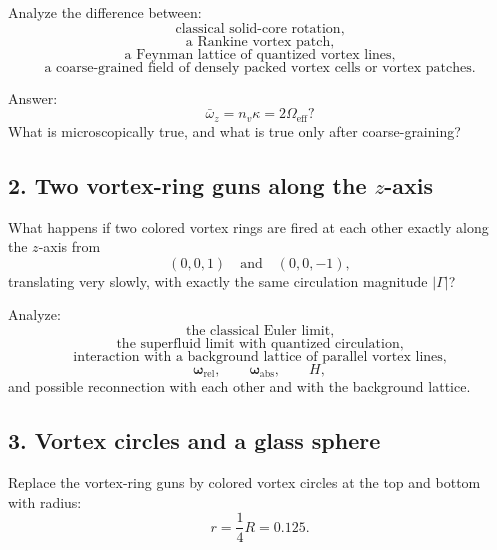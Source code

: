 \documentclass[11pt]{article}
\begin{document}
            Analyze the difference between:
            \[
                \text{classical solid-core rotation,}
            \]
            \[
                \text{a Rankine vortex patch,}
            \]
            \[
                \text{a Feynman lattice of quantized vortex lines,}
            \]
            \[
                \text{a coarse-grained field of densely packed vortex cells or vortex patches.}
            \]
            
            Answer:
            \[
                \bar{\omega}_z
                =
                n_v\kappa
                =
                2\Omega_{\mathrm{eff}}?
            \]
            What is microscopically true, and what is true only after coarse-graining?
        
        \subsection{2. Two vortex-ring guns along the \(z\)-axis}
            
            What happens if two colored vortex rings are fired at each other exactly along the \(z\)-axis from
            \[
                (0,0,1)
                \quad\text{and}\quad
                (0,0,-1),
            \]
            translating very slowly, with exactly the same circulation magnitude \(|\Gamma|\)?
            
            Analyze:
            \[
                \text{the classical Euler limit,}
            \]
            \[
                \text{the superfluid limit with quantized circulation,}
            \]
            \[
                \text{interaction with a background lattice of parallel vortex lines,}
            \]
            \[
                \boldsymbol{\omega}_{\mathrm{rel}},
                \qquad
                \boldsymbol{\omega}_{\mathrm{abs}},
                \qquad
                H,
            \]
            and possible reconnection with each other and with the background lattice.
        
        \subsection{3. Vortex circles and a glass sphere}
            
            Replace the vortex-ring guns by colored vortex circles at the top and bottom with radius:
            \[
                r=\frac{1}{4}R=0.125.
            \]
            
\end{document}
